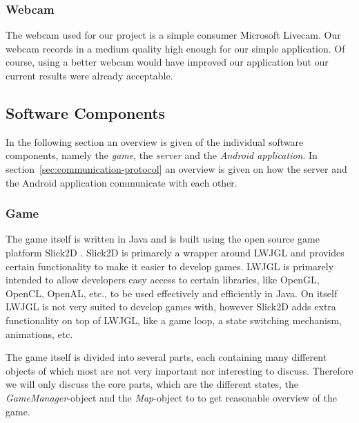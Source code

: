\documentclass[a4paper,10pt]{article}
\begin{document}
		\subsubsection{Webcam}
		The webcam used for our project is a simple consumer Microsoft Livecam. 
		Our webcam records in a medium quality high enough for our simple application. 
		Of course, using a better webcam would have improved our application but our current results were already acceptable. 
		


	\subsection{Software Components}
	\label{sec:software-components}
	In the following section an overview is given of the individual software components, namely the \emph{game}, the \emph{server} and the \emph{Android application}.
	In section~\ref{sec:communication-protocol} an overview is given on how the server and the Android application communicate with each other.

		\subsubsection{Game}
		The game itself is written in Java and is built using the open source game platform Slick2D \cite{Slick2D}.
		Slick2D is primarely a wrapper around LWJGL \cite{LWJGL} and provides certain functionality to make it easier to develop games.
		LWJGL is primarely intended to allow developers easy access to certain libraries, like OpenGL, OpenCL, OpenAL, etc., to be used effectively and efficiently in Java.
		On itself LWJGL is not very suited to develop games with, however Slick2D adds extra functionality on top of LWJGL, like a game loop, a state switching mechanism, animations, etc.
		
		The game itself is divided into several parts, each containing many different objects of which most are not very important nor interesting to discuss.
		Therefore we will only discuss the core parts, which are the different states, the \emph{GameManager}-object and the \emph{Map}-object to to get reasonable overview of the game.
		
\end{document}
